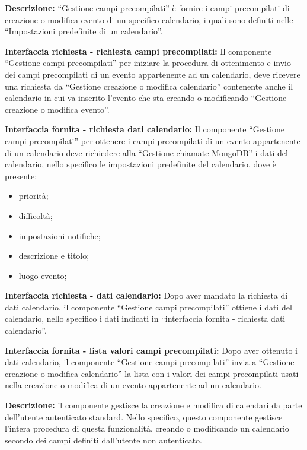 \begin{listaPersonale}[DCI]{}

    \textbf{Descrizione:}  “Gestione campi precompilati” è fornire i campi precompilati di creazione o modifica evento di un specifico calendario, i quali sono definiti nelle “Impostazioni predefinite di un calendario”.

    \textbf{Interfaccia richiesta - richiesta campi precompilati:} Il componente “Gestione campi precompilati” per iniziare la procedura di ottenimento e invio dei campi precompilati di un evento appartenente ad un calendario, deve ricevere una richiesta da “Gestione creazione o modifica calendario” contenente anche il calendario in cui va inserito l'evento che sta creando o modificando “Gestione creazione o modifica evento”.

    \textbf{Interfaccia fornita - richiesta dati calendario:} Il componente “Gestione campi precompilati” per ottenere i campi precompilati di un evento appartenente di un calendario deve richiedere alla “Gestione chiamate MongoDB” i dati del calendario, nello specifico le impostazioni predefinite del calendario, dove è presente:
    \begin{itemize}
        \item priorità;
        \item difficoltà;
        \item impostazioni notifiche;
        \item descrizione e titolo;
        \item luogo evento;
    \end{itemize}

    \textbf{Interfaccia richiesta - dati calendario:} Dopo aver mandato la richiesta di dati calendario, il componente “Gestione campi precompilati” ottiene i dati del calendario, nello specifico i dati indicati in “interfaccia fornita - richiesta dati calendario”.

    \textbf{Interfaccia fornita - lista valori campi precompilati:} Dopo aver ottenuto i dati calendario, il componente “Gestione campi precompilati” invia a “Gestione creazione o modifica calendario” la lista con i valori dei campi precompilati usati nella creazione o modifica di un evento appartenente ad un calendario.



    \textbf{Descrizione:} il componente gestisce la creazione e modifica di calendari da parte dell'utente autenticato standard. Nello specifico, questo componente gestisce l'intera procedura di questa funzionalità, creando o modificando un calendario secondo dei campi definiti dall'utente non autenticato.


\end{listaPersonale}
